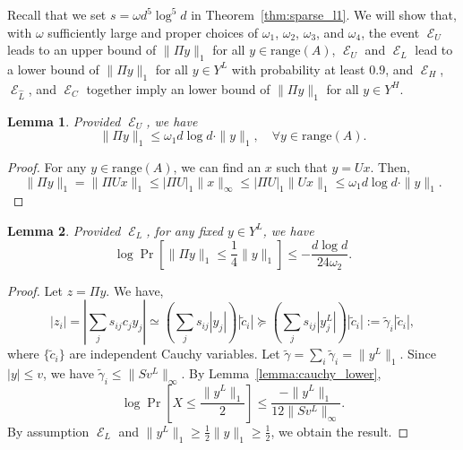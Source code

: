 \documentclass[11pt]{article}
\newtheorem{lemma}{Lemma}
\DeclareMathOperator{\E}{\mathcal{E}}
\begin{document}
Recall that we set $s = \omega d^5 \log^5 d$ in Theorem~\ref{thm:sparse_l1}. 
We will show that, with $\omega$ sufficiently large and proper choices of
$\omega_1$, $\omega_2$, $\omega_3$, and $\omega_4$, the event $\E_U$
leads to an upper bound of $\|\Pi y\|_1$ for all $y \in \text{range}(A)$,
$\E_U$ and $\E_L$ lead to a lower bound of $\|\Pi y\|_1$ for
all $y \in Y^L$ with probability at least $0.9$, and $\E_H$,
$\E_{\hat{L}}$, and $\E_C$ together imply an lower bound of
$\|\Pi y\|_1$ for all $y \in Y^H$.

\begin{lemma}
  \label{lemma:upper}
  Provided $\E_U$, we have
  \begin{equation*}
    \|\Pi y\|_1 \leq \omega_1 d \log d \cdot \|y\|_1, 
    \quad \forall y \in \mathrm{range}(A).
  \end{equation*}
\end{lemma}
\begin{proof}
  For any $y \in \text{range}(A)$, we can find an $x$ such that $y = U x$.
  Then,
  \begin{equation*}
    \|\Pi y\|_1 = \|\Pi U x\|_1 \leq |\Pi U|_1 \|x\|_\infty 
    \leq |\Pi U|_1 \|U x\|_1 \leq \omega_1 d \log d \cdot \|y\|_1.
  \end{equation*}
\end{proof}
\begin{lemma}
  \label{lemma:L_1}
  Provided $\E_{L}$, for any fixed $y \in Y^L$, we have
  \begin{equation*}
    \log \Pr\left[\|\Pi y\|_1 \leq \frac{1}{4} \|y\|_1 \right] 
    \leq - \frac{d \log d}{24 \omega_2}.
  \end{equation*}
\end{lemma}

\begin{proof}
  Let $z = \Pi y$. We have,
  \begin{equation*}
    |z_i| = \left|\sum_{j} s_{ij} c_j y_j\right| 
    \simeq \left( \sum_{j} s_{ij} |y_j| \right) |\tilde{c}_i| 
    \succeq  \left( \sum_{j} s_{ij} |y^L_j| \right) |\tilde{c}_i| 
    := \tilde{\gamma}_i |\tilde{c}_i|,
  \end{equation*}
  where $\{\tilde{c}_i\}$ are independent Cauchy variables.
  Let $\tilde{\gamma} = \sum_i \tilde{\gamma}_i = \|y^L\|_1$.
  Since $|y| \leq v$, we have $\tilde{\gamma}_i \leq \|S v^L\|_\infty$.
  By Lemma~\ref{lemma:cauchy_lower},
  \begin{equation*}
    \log \Pr\left[X \leq \frac{\|y^L\|_1}{2} \right] 
    \leq  \frac{-\|y^L\|_1}{12 \|S v^L\|_\infty}.
  \end{equation*}
  By assumption $\E_L$ and $\|y^L\|_1 \geq \frac{1}{2} \|y\|_1 \geq
  \frac{1}{2}$, we obtain the result.
\end{proof}
\end{document}

